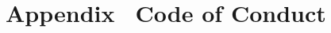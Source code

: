 \section*{Appendix \thesection \, \textbar \vspace{0.5em} Code of Conduct}
\label{sec:appendix-code-of-conduct}
%